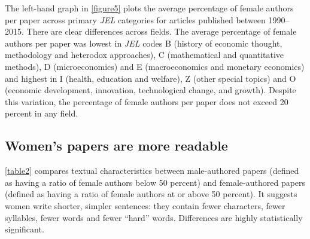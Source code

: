 The left-hand graph in \autoref{figure5} plots the average percentage of female authors per paper across primary \emph{JEL} categories for articles published between 1990--2015. There are clear differences across fields. The average percentage of female authors per paper was lowest in \emph{JEL} codes B (history of economic thought, methodology and heterodox approaches), C (mathematical and quantitative methods), D (microeconomics) and E (macroeconomics and monetary economics) and highest in I (health, education and welfare), Z (other special topics) and O (economic development, innovation, technological change, and growth). Despite this variation, the percentage of female authors per paper does not exceed 20 percent in any field.

\subsection{Women's papers are more readable}
\label{articlelevel}

\autoref{table2} compares textual characteristics between male-authored papers (defined as having a ratio of female authors below 50 percent) and female-authored papers (defined as having a ratio of female authors at or above 50 percent). It suggests women write shorter, simpler sentences: they contain fewer characters, fewer syllables, fewer words and fewer ``hard'' words. Differences are highly statistically significant.



